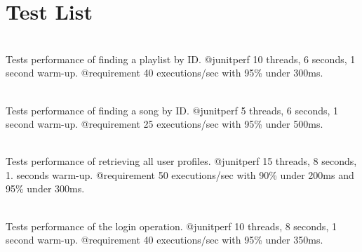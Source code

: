 \chapter{Test List }
\hypertarget{test}{}\label{test}

\begin{DoxyRefList}
\item[{\parbox[t]{\linewidth}{Member \doxylink{classcom_1_1deusto_1_1deuspotify_1_1_deuspotify_perf_i_t_aa1e705595754e5fb00b01137a4b72ba3}{com.deusto.deuspotify.Deuspotify\+Perf\+IT.test\+Find\+Playlist\+By\+Id\+Performance} ()}}]\hfill \\
\label{test__test000078}%
%
Tests performance of finding a playlist by ID. @junitperf 10 threads, 6 seconds, 1 second warm-\/up. @requirement 40 executions/sec with 95\% under 300ms.  
\item[{\parbox[t]{\linewidth}{Member \doxylink{classcom_1_1deusto_1_1deuspotify_1_1_deuspotify_perf_i_t_a97a302051702747b2ef5c312692ae656}{com.deusto.deuspotify.Deuspotify\+Perf\+IT.test\+Find\+Song\+By\+Id\+Performance} ()}}]\hfill \\
\label{test__test000077}%
%
Tests performance of finding a song by ID. @junitperf 5 threads, 6 seconds, 1 second warm-\/up. @requirement 25 executions/sec with 95\% under 500ms.  
\item[{\parbox[t]{\linewidth}{Member \doxylink{classcom_1_1deusto_1_1deuspotify_1_1_deuspotify_perf_i_t_a2650c6e6e1a4a9b8bc40f05d0bdbd189}{com.deusto.deuspotify.Deuspotify\+Perf\+IT.test\+Get\+All\+Profiles\+Performance} ()}}]\hfill \\
\label{test__test000079}%
%
Tests performance of retrieving all user profiles. @junitperf 15 threads, 8 seconds, 1. seconds warm-\/up. @requirement 50 executions/sec with 90\% under 200ms and 95\% under 300ms.  
\item[{\parbox[t]{\linewidth}{Member \doxylink{classcom_1_1deusto_1_1deuspotify_1_1_deuspotify_perf_i_t_ae86d90ff0a2fc25d7c29e859200c4a66}{com.deusto.deuspotify.Deuspotify\+Perf\+IT.test\+Login\+Performance} ()}}]\hfill \\
\label{test__test000080}%
%
Tests performance of the login operation. @junitperf 10 threads, 8 seconds, 1 second warm-\/up. @requirement 40 executions/sec with 95\% under 350ms.  
\item[{\parbox[t]{\linewidth}{Member \doxylink{classcom_1_1deusto_1_1deuspotify_1_1_deuspotify_perf_i_t_a1224ab3e104c5f88028530ac600fb920}{com.deusto.deuspotify.Deuspotify\+Perf\+IT.test\+Retrieve\+All\+Playlists\+Performance} ()}}]\hfill \\

\end{DoxyRefList}
